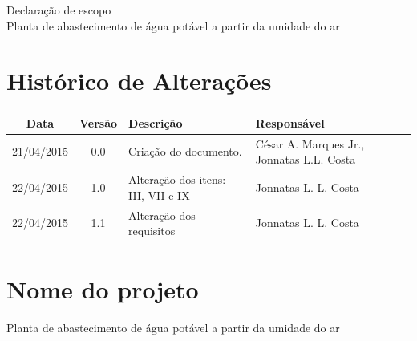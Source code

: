 % 
% 
% 


\begin{center}
 {\large Declaração de escopo}\\[0.2cm]
 {Planta de abastecimento de água potável a partir da umidade do ar}\\
 \end{center}
 
 \section*{Histórico de Alterações}
\begin{table}[h]
\centering
\begin{tabular}{|c|c|p{6cm}|p{5cm}|}

\hline
Data & Versão & Descrição & Responsável\\
\hline                               
21/04/2015 & 0.0 & Criação do documento. & César A. Marques Jr., Jonnatas L.L. Costa\\
\hline
22/04/2015 & 1.0 & Alteração dos itens: III, VII e IX & Jonnatas L. L. Costa\\
\hline
22/04/2015 & 1.1 & Alteração dos requisitos & Jonnatas L. L. Costa\\
\hline
\end{tabular}
\end{table}

\section*{Nome do projeto}
  Planta de abastecimento de água potável a partir da umidade do ar
  
